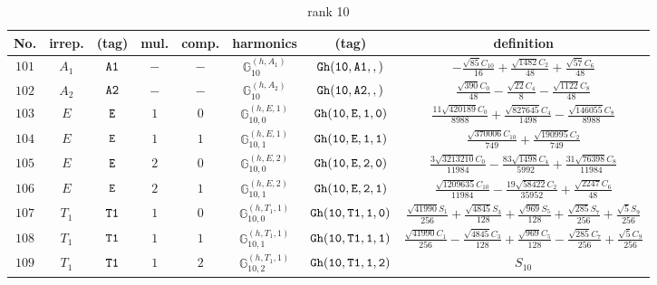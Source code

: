 \documentclass[fleqn,8pt]{jsarticle}
\begin{document}
\begin{table}[ht!]
\begin{center}
\caption{rank 10}
\renewcommand{\arraystretch}{1.3}
\begin{tabular}{cccccccc} \hline \hline
No. & irrep. & (tag) & mul. & comp. & harmonics & (tag) & definition \\ \hline
$ 101 $ & $ A_{1} $ & $ {\tt A1} $ & $ - $ & $ - $ & $ \mathbb{G}_{10}^{(h,A_{1})} $ & $ {\tt Gh(10,A1,,)} $ & $ - \frac{\sqrt{85} C_{10}}{16} + \frac{\sqrt{1482} C_{2}}{48} + \frac{\sqrt{57} C_{6}}{48} $ \\
$ 102 $ & $ A_{2} $ & $ {\tt A2} $ & $ - $ & $ - $ & $ \mathbb{G}_{10}^{(h,A_{2})} $ & $ {\tt Gh(10,A2,,)} $ & $ \frac{\sqrt{390} C_{0}}{48} - \frac{\sqrt{22} C_{4}}{8} - \frac{\sqrt{1122} C_{8}}{48} $ \\
$ 103 $ & $ E $ & $ {\tt E} $ & $ 1 $ & $ 0 $ & $ \mathbb{G}_{10,0}^{(h,E,1)} $ & $ {\tt Gh(10,E,1,0)} $ & $ \frac{11 \sqrt{420189} C_{0}}{8988} + \frac{\sqrt{827645} C_{4}}{1498} - \frac{\sqrt{146055} C_{8}}{8988} $ \\
$ 104 $ & $ E $ & $ {\tt E} $ & $ 1 $ & $ 1 $ & $ \mathbb{G}_{10,1}^{(h,E,1)} $ & $ {\tt Gh(10,E,1,1)} $ & $ \frac{\sqrt{370006} C_{10}}{749} + \frac{\sqrt{190995} C_{2}}{749} $ \\
$ 105 $ & $ E $ & $ {\tt E} $ & $ 2 $ & $ 0 $ & $ \mathbb{G}_{10,0}^{(h,E,2)} $ & $ {\tt Gh(10,E,2,0)} $ & $ \frac{3 \sqrt{3213210} C_{0}}{11984} - \frac{83 \sqrt{1498} C_{4}}{5992} + \frac{31 \sqrt{76398} C_{8}}{11984} $ \\
$ 106 $ & $ E $ & $ {\tt E} $ & $ 2 $ & $ 1 $ & $ \mathbb{G}_{10,1}^{(h,E,2)} $ & $ {\tt Gh(10,E,2,1)} $ & $ \frac{\sqrt{1209635} C_{10}}{11984} - \frac{19 \sqrt{58422} C_{2}}{35952} + \frac{\sqrt{2247} C_{6}}{48} $ \\
$ 107 $ & $ T_{1} $ & $ {\tt T1} $ & $ 1 $ & $ 0 $ & $ \mathbb{G}_{10,0}^{(h,T_{1},1)} $ & $ {\tt Gh(10,T1,1,0)} $ & $ \frac{\sqrt{41990} S_{1}}{256} + \frac{\sqrt{4845} S_{3}}{128} + \frac{\sqrt{969} S_{5}}{128} + \frac{\sqrt{285} S_{7}}{256} + \frac{\sqrt{5} S_{9}}{256} $ \\
$ 108 $ & $ T_{1} $ & $ {\tt T1} $ & $ 1 $ & $ 1 $ & $ \mathbb{G}_{10,1}^{(h,T_{1},1)} $ & $ {\tt Gh(10,T1,1,1)} $ & $ \frac{\sqrt{41990} C_{1}}{256} - \frac{\sqrt{4845} C_{3}}{128} + \frac{\sqrt{969} C_{5}}{128} - \frac{\sqrt{285} C_{7}}{256} + \frac{\sqrt{5} C_{9}}{256} $ \\
$ 109 $ & $ T_{1} $ & $ {\tt T1} $ & $ 1 $ & $ 2 $ & $ \mathbb{G}_{10,2}^{(h,T_{1},1)} $ & $ {\tt Gh(10,T1,1,2)} $ & $ S_{10} $ \\

\end{tabular}
\end{center}
\end{table}
\end{document}
